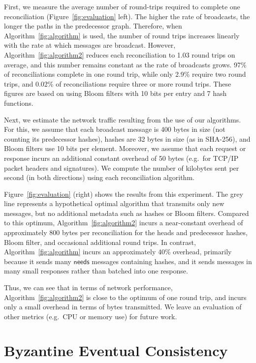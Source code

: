 \documentclass[a4paper,anonymous,USenglish]{lipics-v2019}
\begin{document}
First, we measure the average number of round-trips required to complete one reconciliation (Figure~\ref{fig:evaluation} left).
The higher the rate of broadcasts, the longer the paths in the predecessor graph.
Therefore, when Algorithm~\ref{fig:algorithm} is used, the number of round trips increases linearly with the rate at which messages are broadcast.
However, Algorithm~\ref{fig:algorithm2} reduces each reconciliation to 1.03 round trips on average, and this number remains constant as the rate of broadcasts grows.
97\% of reconciliations complete in one round trip, while only 2.9\% require two round trips, and 0.02\% of reconciliations require three or more round trips.
These figures are based on using Bloom filters with 10 bits per entry and 7 hash functions.

Next, we estimate the network traffic resulting from the use of our algorithms.
For this, we assume that each broadcast message is 400 bytes in size (not counting its predecessor hashes), hashes are 32 bytes in size (as in SHA-256), and Bloom filters use 10 bits per element.
Moreover, we assume that each request or response incurs an additional constant overhead of 50 bytes (e.g.\ for TCP/IP packet headers and signatures).
We compute the number of kilobytes sent per second (in both directions) using each reconciliation algorithm.

Figure~\ref{fig:evaluation} (right) shows the results from this experiment.
The grey line represents a hypothetical optimal algorithm that transmits only new messages, but no additional metadata such as hashes or Bloom filters.
Compared to this optimum, Algorithm~\ref{fig:algorithm2} incurs a near-constant overhead of approximately 800 bytes per reconciliation for the heads and predecessor hashes, Bloom filter, and occasional additional round trips.
In contrast, Algorithm~\ref{fig:algorithm} incurs an approximately 40\% overhead, primarily because it sends many $\mathsf{needs}$ messages containing hashes, and it sends messages in many small responses rather than batched into one response.

Thus, we can see that in terms of network performance, Algorithm~\ref{fig:algorithm2} is close to the optimum of one round trip, and incurs only a small overhead in terms of bytes transmitted.
We leave an evaluation of other metrics (e.g.\ CPU or memory use) for future work.

\section{Byzantine Eventual Consistency}\label{sec:byzantine-crdts}
\end{document}

